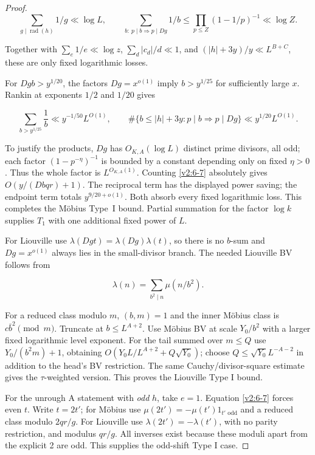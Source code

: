 \documentclass[11pt]{article}
\theoremstyle{definition}
\theoremstyle{remark}
\numberwithin{equation}{section}
\begin{document}
\begin{proof}
\begin{equation}
\sum_{g\mid\operatorname{rad}(h)}1/g\ll\log L,\qquad
\sum_{b:\ p\mid b\Rightarrow p\mid Dg}1/b
\le\prod_{p\le Z}(1-1/p)^{-1}\ll\log Z.
\end{equation}


Together with $\sum_e1/e\ll\log z$, $\sum_d|c_d|/d\ll1$, and $(|h|+3y)/y\ll L^{B+C}$, these are only fixed logarithmic losses.

For $Dgb>y^{1/20}$, the factors $Dg=x^{o(1)}$ imply $b>y^{1/25}$ for sufficiently large $x$. Rankin at exponents $1/2$ and $1/20$ gives


\begin{equation}
\sum_{b>y^{1/25}}\frac1b\ll y^{-1/50}L^{O(1)},\qquad
\#\{b\le |h|+3y:p\mid b\Rightarrow p\mid Dg\}
\ll y^{1/20}L^{O(1)}.
\end{equation}


To justify the products, $Dg$ has $O_{K,A}(\log L)$ distinct prime divisors, all odd; each factor $(1-p^{-\eta})^{-1}$ is bounded by a constant depending only on fixed $\eta>0$. Thus the whole factor is $L^{O_{K,A}(1)}$. Counting \eqref{v2:6-7} absolutely gives $O(y/(Dbqr)+1)$. The reciprocal term has the displayed power saving; the endpoint term totals $y^{9/20+o(1)}$. Both absorb every fixed logarithmic loss. This completes the M\"obius Type~I bound. Partial summation for the factor $\log k$ supplies $T_1$ with one additional fixed power of $L$.

For Liouville use $\lambda(Dgt)=\lambda(Dg)\lambda(t)$, so there is no $b$-sum and $Dg=x^{o(1)}$ always lies in the small-divisor branch. The needed Liouville BV follows from


\begin{equation}
\lambda(n)=\sum_{b^2\mid n}\mu(n/b^2).
\end{equation}


For a reduced class modulo $m$, $(b,m)=1$ and the inner M\"obius class is $c\bar b^2\pmod m$. Truncate at $b\le L^{A+2}$. Use M\"obius BV at scale $Y_0/b^2$ with a larger fixed logarithmic level exponent. For the tail summed over $m\le Q$ use $Y_0/(b^2m)+1$, obtaining $O(Y_0L/L^{A+2}+Q\sqrt{Y_0})$; choose $Q\le\sqrt{Y_0}L^{-A-2}$ in addition to the head's BV restriction. The same Cauchy/divisor-square estimate gives the $\tau$-weighted version. This proves the Liouville Type I bound.

For the unrough A statement with \emph{odd} $h$, take $e=1$. Equation \eqref{v2:6-7} forces even $t$. Write $t=2t'$; for M\"obius use $\mu(2t')=-\mu(t')1_{t'\text{ odd}}$ and a reduced class modulo $2qr/g$. For Liouville use $\lambda(2t')=-\lambda(t')$, with no parity restriction, and modulus $qr/g$. All inverses exist because these moduli apart from the explicit 2 are odd. This supplies the odd-shift Type I case.

\end{proof}
\end{document}
